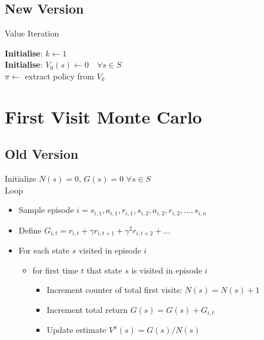\documentclass[11pt,a4paper,ngerman]{article}
\begin{document}
\subsection{New Version}
\begin{algorithm}[H]
    \caption{Value Iteration}
    \textbf{Initialise}: $k \gets 1$\\
    \textbf{Initialise}: $V_0(s) \gets 0 \quad \forall s \in S$\\
    $\pi \leftarrow$ extract policy from $V_k$
    
\end{algorithm}

\newpage

\section{First Visit Monte Carlo}
\subsection{Old Version}
Initialize $N(s) = 0$, $G(s) = 0$ $\forall s \in S$\\
Loop 
\begin{itemize}
	\item Sample episode $i = s_{i,1}, a_{i,1}, r_{i,1}, s_{i,2}, a_{i,2}, r_{i,2}, \ldots,s_{i,n}$
	\item Define $G_{i,t} = r_{i,t} + \gamma r_{i,t+1} + \gamma^2 r_{i,t+2} + \ldots$
	\item For each state $s$ visited in episode $i$
	\begin{itemize}
		\item for first time $t$ that state $s$ is visited in episode $i$
		\begin{itemize}
			\item Increment counter of total first visits: $N(s) = N(s) + 1$
			\item Increment total return $G(s) = G(s) + G_{i,t}$
			\item Update estimate $V^\pi (s) = G(s) /N(s)$
		\end{itemize}
	\end{itemize}
\end{itemize}
\end{document}
